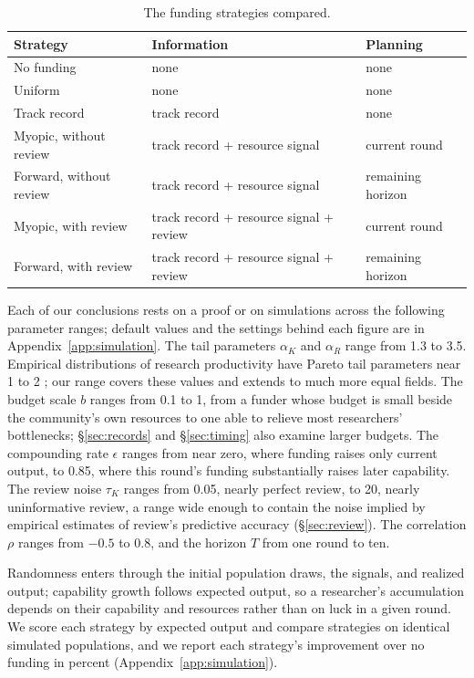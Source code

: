 \documentclass[article, 11pt, reqno]{amsart}
\theoremstyle{named}
\begin{document}
\begin{table}[t]
\centering
\footnotesize
\setlength{\tabcolsep}{4pt}
\begin{tabular*}{\textwidth}{@{\extracolsep{\fill}}lll@{}}
\toprule
Strategy & Information & Planning \\
\midrule
No funding & none & none \\
Uniform & none & none \\
Track record & track record & none \\
Myopic, without review & track record + resource signal & current round \\
Forward, without review & track record + resource signal & remaining horizon \\
Myopic, with review & track record + resource signal + review & current round \\
Forward, with review & track record + resource signal + review & remaining horizon \\
\bottomrule
\end{tabular*}
\caption{The funding strategies compared.}
\label{tab:strategies}
\end{table}

Each of our conclusions rests on a proof or on simulations across the following parameter ranges; default values and the settings behind each figure are in Appendix~\ref{app:simulation}. The tail parameters $\alpha_K$ and $\alpha_R$ range from 1.3 to 3.5. Empirical distributions of research productivity have Pareto tail parameters near 1 to 2 \citep{Lotka1926, Nicholls1989}; %
our range covers these values and extends to much more equal fields. The budget scale $b$ ranges from 0.1 to 1, from a funder whose budget is small beside the community's own resources to one able to relieve most researchers' bottlenecks; \S\ref{sec:records} and \S\ref{sec:timing} also examine larger budgets. The compounding rate $\epsilon$ ranges from near zero, where funding raises only current output, to 0.85, where this round's funding substantially raises later capability. The review noise $\tau_K$ ranges from 0.05, nearly perfect review, to 20, nearly uninformative review, a range wide enough to contain the noise implied by empirical estimates of review's predictive accuracy (\S\ref{sec:review}). The correlation $\rho$ ranges from $-0.5$ to 0.8, and the horizon $T$ from one round to ten.

Randomness enters through the initial population draws, the signals, and realized output; capability growth follows expected output, so a researcher's accumulation depends on their capability and resources rather than on luck in a given round. We score each strategy by expected output and compare strategies on identical simulated populations, and we report each strategy's improvement over no funding in percent (Appendix~\ref{app:simulation}).
\end{document}
